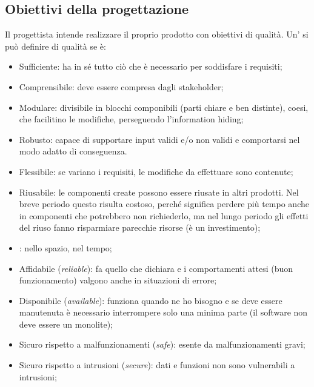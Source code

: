 \documentclass[../main]{subfiles}
\begin{document}
\subsection{Obiettivi della progettazione}
Il progettista intende realizzare il proprio prodotto con obiettivi di qualità.\newline
Un' si può definire di qualità se è:
\begin{itemize}
    \item Sufficiente: ha in sé tutto ciò che è necessario per soddisfare i requisiti;
    \item Comprensibile: deve essere compresa dagli stakeholder;
    \item Modulare: divisibile in blocchi componibili (parti chiare e ben distinte), coesi, che facilitino le modifiche, perseguendo l'information hiding;
    \item Robusto: capace di supportare input validi e/o non validi e comportarsi nel modo adatto di conseguenza.
    \item Flessibile: se variano i requisiti, le modifiche da effettuare sono contenute;
    \item Riusabile: le componenti create possono essere riusate in altri prodotti. Nel breve periodo questo risulta costoso, perché significa perdere più tempo anche in componenti che potrebbero non richiederlo, ma nel lungo periodo gli effetti del riuso fanno risparmiare parecchie risorse (è un investimento);
    \item {}: nello spazio, nel tempo;
    \item Affidabile (\textit{reliable}): fa quello che dichiara e i comportamenti attesi (buon funzionamento) valgono anche in situazioni di errore;
    \item Disponibile (\textit{available}): funziona quando ne ho bisogno e se deve essere manutenuta è necessario interrompere solo una minima parte (il software non deve essere un monolite);
    \item Sicuro rispetto a malfunzionamenti (\textit{safe}): esente da malfunzionamenti gravi;
    \item Sicuro rispetto a intrusioni (\textit{secure}): dati e funzioni non sono vulnerabili a intrusioni;
\end{itemize}
\end{document}
